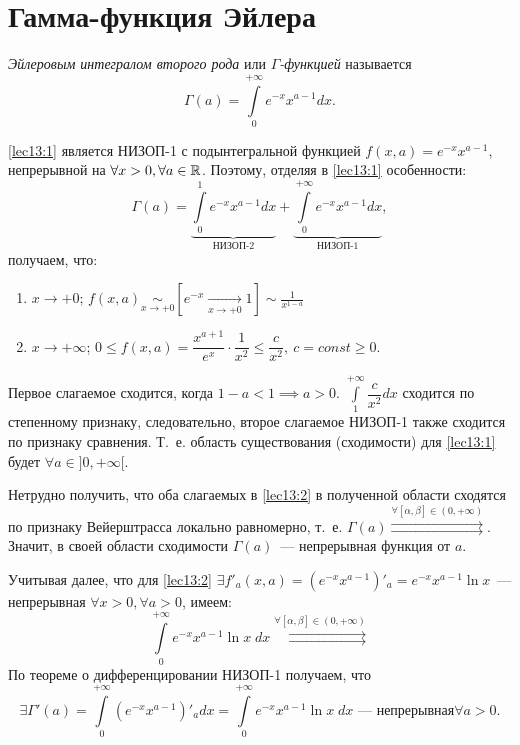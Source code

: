 \documentclass[../../main.tex]{subfiles}
\begin{document}
\section{Гамма-функция Эйлера}

\emph{Эйлеровым интегралом второго рода} или \emph{$\Gamma$-функцией} называется
\begin{equation}
\label{lec13:1}
\Gamma(a) = \int\limits_0^{+\infty}e^{-x}x^{a-1}dx.
\end{equation}

\eqref{lec13:1} является НИЗОП-1 с подынтегральной функцией
$f(x, a) = e^{-x}x^{a-1}$, непрерывной на $\forall x > 0, \forall a \in \mathbb{R}$. Поэтому, отделяя в \eqref{lec13:1} особенности:
\begin{equation}
	\Gamma(a) = \underbrace{\int\limits_0^1e^{-x}x^{a-1}dx}_{\text{НИЗОП-2}} + \underbrace{\int\limits_0^{+\infty}e^{-x}x^{a-1}dx}_{\text{НИЗОП-1}},
\label{lec13:2} 
\end{equation}
получаем, что:
\begin{enumerate}
\item 
$x \to + 0$; 
$\displaystyle f(x, a) \underset{x \to +0}\sim \left[ e^{-x} 
\underset{x \to +0} \to 1 \right] \sim \frac{1}{x^{1-a}}$
\item
$x \to +\infty$;
$0 \le f(x, a) = \dfrac{x^{a+1}}{e^x} \cdot \dfrac{1}{x^2} \le \dfrac{c}{x^2},\ 
c=const \ge 0$.
\end{enumerate}
Первое слагаемое сходится, когда $1 - a < 1 \implies a > 0$.
$\int\limits_1^{+\infty}\dfrac{c}{x^2}dx$ сходится по степенному признаку, следовательно, второе слагаемое НИЗОП-1 также сходится по признаку сравнения.
Т.~е. область существования (сходимости) для \eqref{lec13:1} будет $\forall a \in ]0, +\infty[$.

Нетрудно получить, что оба слагаемых в \eqref{lec13:2} в полученной области 
сходятся по признаку Вейерштрасса локально равномерно, т.~е.
$\Gamma(a) \overset{\forall \left[ \alpha, \beta \right] \in (0, 
+\infty)}{\rightrightarrows}$.
Значит, в своей области сходимости $\Gamma(a)$~--- непрерывная функция от $a$.

Учитывая далее, что для \eqref{lec13:2}
$\exists f'_a(x, a) = (e^{-x} x^{a-1})'_a = e^{-x}x^{a-1} \ln x$~--- 
непрерывная $\forall x>0,\forall a >0$, имеем:
\[
\int\limits_0^{+\infty} e^{-x} x^{a-1} \ln x\; dx
\overset{\forall \left[ \alpha, \beta \right] \in (0, 
	+\infty)}{\rightrightarrows}
\]
По теореме о дифференцировании НИЗОП-1 получаем, что
\[
\exists \Gamma'(a) = \int\limits_0^{+\infty} (e^{-x} x^{a-1})'_a dx = 
\int\limits_0^{+\infty} e^{-x} x^{a-1} \ln x\; dx 
\text{~--- непрерывная
$\forall a > 0$}.\]
\end{document}
